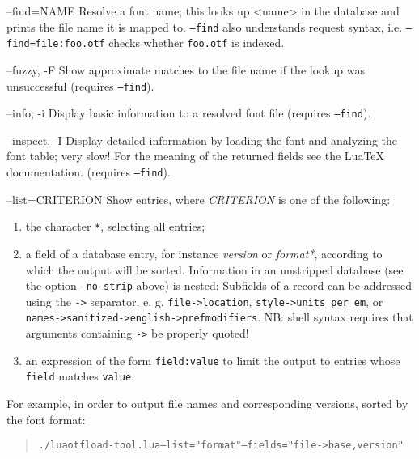 \documentclass[a4paper]{article}
\providecommand*{\DUoptionlistlabel}[1]{\bf #1 \hfill}
\newenvironment{DUoptionlist}{%
    \list{}{\setlength{\labelwidth}{\DUoptionlistindent}
            \setlength{\rightmargin}{1cm}
            \setlength{\leftmargin}{\rightmargin}
            \addtolength{\leftmargin}{\labelwidth}
            \addtolength{\leftmargin}{\labelsep}
            \renewcommand{\makelabel}{\DUoptionlistlabel}}
  }
  {\endlist}
\begin{document}
\begin{DUoptionlist}
\item[--find=NAME]  Resolve a font name; this looks up <name> in
the database and prints the file name it is
mapped to.
\texttt{--find} also understands request syntax,
i.e. \texttt{--find=file:foo.otf} checks whether
\texttt{foo.otf} is indexed.

\item[--fuzzy, -F]  Show approximate matches to the file name if
the lookup was unsuccessful (requires
\texttt{--find}).

\item[--info, -i]  Display basic information to a resolved font
file (requires \texttt{--find}).

\item[--inspect, -I]  Display detailed information by loading the
font and analyzing the font table; very slow!
For the meaning of the returned fields see
the LuaTeX documentation.
(requires \texttt{--find}).

\item[--list=CRITERION]  Show entries, where \emph{CRITERION} is one of the
following:

\begin{enumerate}
\renewcommand{\labelenumi}{\arabic{enumi})}
\item the character \texttt{*}, selecting all entries;

\item a field of a database entry, for instance
\emph{version} or \emph{format*}, according to which
the output will be sorted.
Information in an unstripped database (see
the option \texttt{--no-strip} above) is nested:
Subfields of a record can be addressed using
the \texttt{->} separator, e. g.
\texttt{file->location}, \texttt{style->units\_per\_em},
or
\texttt{names->sanitized->english->prefmodifiers}.
NB: shell syntax requires that arguments
containing \texttt{->} be properly quoted!

\item an expression of the form \texttt{field:value} to
limit the output to entries whose \texttt{field}
matches \texttt{value}.
\end{enumerate}

For example, in order to output file names and
corresponding versions, sorted by the font
format:

\begin{quote}
\begin{alltt}
./luaotfload-tool.lua --list="format" --fields="file->base,version"
\end{alltt}
\end{quote}


\end{DUoptionlist}
\end{document}
